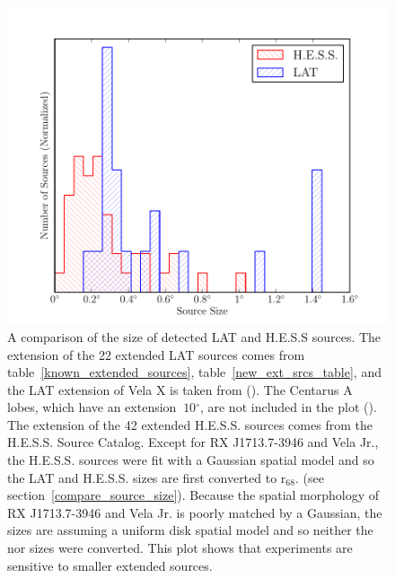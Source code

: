 \documentclass[12pt,preprint]{aastex}
\newcommand{\gev}{\text{GeV}\xspace}
\newcommand{\tev}{\text{TeV}\xspace}
\newcommand{\rsixeight}{{\ensuremath{\text{r}_{68}}}\xspace}
\renewcommand{\deg}{\ensuremath{^\circ}\xspace}
\begin{document}
\clearpage
\begin{figure}
  \begin{center}
    \includegraphics{summary_plots/gev_vs_tev_histogram.pdf}
    \end{center}
    \caption{
    A comparison of the size of detected LAT and H.E.S.S sources.
    The extension of the 22 extended LAT sources comes from
    table~\ref{known_extended_sources}, table~\ref{new_ext_srcs_table},
    and the LAT extension of Vela X is taken from (\cite{velax}). The
    Centarus A lobes, which have an extension $~10\deg$, are not
    included in the plot (\cite{cen_a_lat}).  The \tev extension of
    the 42 extended H.E.S.S. sources comes from the H.E.S.S. Source
    Catalog\cite{hesscat}.
    Except for RX J1713.7-3946 and Vela Jr.,
    the H.E.S.S. sources were fit with a Gaussian spatial model and
    so the LAT and H.E.S.S. sizes are first converted to \rsixeight.
    (see section~\ref{compare_source_size}). Because the spatial
    morphology of RX J1713.7-3946 and Vela Jr. is poorly matched by a
    Gaussian, the \tev sizes are assuming a uniform disk spatial model
    and so neither the \gev nor \tev sizes were converted.  This plot
    shows that \tev experiments are sensitive to smaller extended sources.
    }\label{gev_vs_tev_histogram}
  \end{figure}
\end{document}
